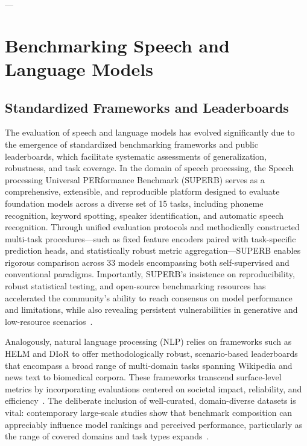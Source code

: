 \documentclass[11pt]{article}
\begin{document}
---

\section{Benchmarking Speech and Language Models}

\subsection{Standardized Frameworks and Leaderboards}

The evaluation of speech and language models has evolved significantly due to the emergence of standardized benchmarking frameworks and public leaderboards, which facilitate systematic assessments of generalization, robustness, and task coverage. In the domain of speech processing, the Speech processing Universal PERformance Benchmark (SUPERB) serves as a comprehensive, extensible, and reproducible platform designed to evaluate foundation models across a diverse set of 15 tasks, including phoneme recognition, keyword spotting, speaker identification, and automatic speech recognition. Through unified evaluation protocols and methodically constructed multi-task procedures—such as fixed feature encoders paired with task-specific prediction heads, and statistically robust metric aggregation—SUPERB enables rigorous comparison across 33 models encompassing both self-supervised and conventional paradigms. Importantly, SUPERB’s insistence on reproducibility, robust statistical testing, and open-source benchmarking resources has accelerated the community’s ability to reach consensus on model performance and limitations, while also revealing persistent vulnerabilities in generative and low-resource scenarios~\cite{ref:101,ref:104}.

Analogously, natural language processing (NLP) relies on frameworks such as HELM and DIoR to offer methodologically robust, scenario-based leaderboards that encompass a broad range of multi-domain tasks spanning Wikipedia and news text to biomedical corpora. These frameworks transcend surface-level metrics by incorporating evaluations centered on societal impact, reliability, and efficiency~\cite{ref:104,ref:106}. The deliberate inclusion of well-curated, domain-diverse datasets is vital: contemporary large-scale studies show that benchmark composition can appreciably influence model rankings and perceived performance, particularly as the range of covered domains and task types expands~\cite{ref:106}.
\end{document}

